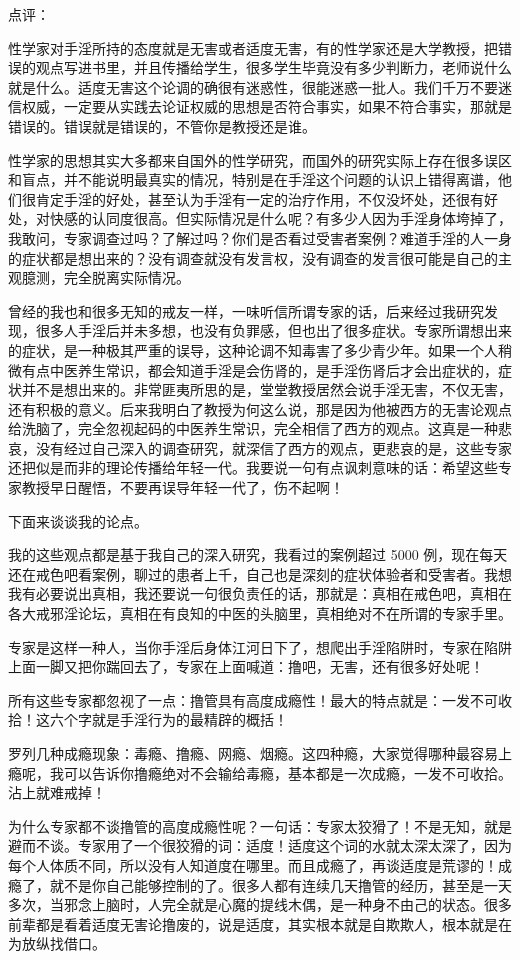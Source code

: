 \documentclass{ctexart}
\begin{document}
点评：

性学家对手淫所持的态度就是无害或者适度无害，有的性学家还是大学教授，把错误的观点写进书里，并且传播给学生，很多学生毕竟没有多少判断力，老师说什么就是什么。适度无害这个论调的确很有迷惑性，很能迷惑一批人。我们千万不要迷信权威，一定要从实践去论证权威的思想是否符合事实，如果不符合事实，那就是错误的。错误就是错误的，不管你是教授还是谁。

性学家的思想其实大多都来自国外的性学研究，而国外的研究实际上存在很多误区和盲点，并不能说明最真实的情况，特别是在手淫这个问题的认识上错得离谱，他们很肯定手淫的好处，甚至认为手淫有一定的治疗作用，不仅没坏处，还很有好处，对快感的认同度很高。但实际情况是什么呢？有多少人因为手淫身体垮掉了，我敢问，专家调查过吗？了解过吗？你们是否看过受害者案例？难道手淫的人一身的症状都是想出来的？没有调查就没有发言权，没有调查的发言很可能是自己的主观臆测，完全脱离实际情况。

曾经的我也和很多无知的戒友一样，一味听信所谓专家的话，后来经过我研究发现，很多人手淫后并未多想，也没有负罪感，但也出了很多症状。专家所谓想出来的症状，是一种极其严重的误导，这种论调不知毒害了多少青少年。如果一个人稍微有点中医养生常识，都会知道手淫是会伤肾的，是手淫伤肾后才会出症状的，症状并不是想出来的。非常匪夷所思的是，堂堂教授居然会说手淫无害，不仅无害，还有积极的意义。后来我明白了教授为何这么说，那是因为他被西方的无害论观点给洗脑了，完全忽视起码的中医养生常识，完全相信了西方的观点。这真是一种悲哀，没有经过自己深入的调查研究，就深信了西方的观点，更悲哀的是，这些专家还把似是而非的理论传播给年轻一代。我要说一句有点讽刺意味的话：希望这些专家教授早日醒悟，不要再误导年轻一代了，伤不起啊！

下面来谈谈我的论点。

我的这些观点都是基于我自己的深入研究，我看过的案例超过 5000 例，现在每天还在戒色吧看案例，聊过的患者上千，自己也是深刻的症状体验者和受害者。我想我有必要说出真相，我还要说一句很负责任的话，那就是：真相在戒色吧，真相在各大戒邪淫论坛，真相在有良知的中医的头脑里，真相绝对不在所谓的专家手里。

专家是这样一种人，当你手淫后身体江河日下了，想爬出手淫陷阱时，专家在陷阱上面一脚又把你踹回去了，专家在上面喊道：撸吧，无害，还有很多好处呢！

所有这些专家都忽视了一点：撸管具有高度成瘾性！最大的特点就是：一发不可收拾！这六个字就是手淫行为的最精辟的概括！

罗列几种成瘾现象：毒瘾、撸瘾、网瘾、烟瘾。这四种瘾，大家觉得哪种最容易上瘾呢，我可以告诉你撸瘾绝对不会输给毒瘾，基本都是一次成瘾，一发不可收拾。沾上就难戒掉！

为什么专家都不谈撸管的高度成瘾性呢？一句话：专家太狡猾了！不是无知，就是避而不谈。专家用了一个很狡猾的词：适度！适度这个词的水就太深太深了，因为每个人体质不同，所以没有人知道度在哪里。而且成瘾了，再谈适度是荒谬的！成瘾了，就不是你自己能够控制的了。很多人都有连续几天撸管的经历，甚至是一天多次，当邪念上脑时，人完全就是心魔的提线木偶，是一种身不由己的状态。很多前辈都是看着适度无害论撸废的，说是适度，其实根本就是自欺欺人，根本就是在为放纵找借口。
\end{document}
